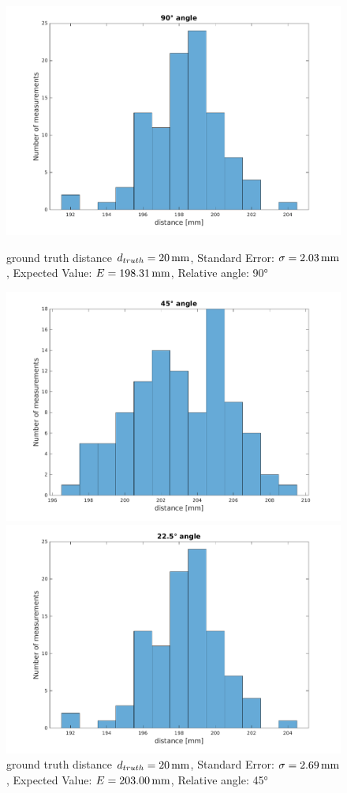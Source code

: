 \begin{figure}
	\centering
	\begin{minipage}{0.3\textwidth}
		\includegraphics[width=0.9\linewidth]{pictures/plot_angles_90.pdf}
		\caption{ground truth distance $d_{truth}= \unit[20]{mm}$, Standard Error: $\sigma=\unit[2.03]{mm}$, Expected Value: $E=\unit[198.31]{mm}$, Relative angle: 90°}
		\label{fig:angle90}
	\end{minipage}
	\quad
	\begin{minipage}{0.3\textwidth}
		\includegraphics[width=0.9\linewidth]{pictures/plot_angles_45.pdf}
		\caption{ground truth distance $d_{truth}= \unit[20]{mm}$, Standard Error: $\sigma=\unit[2.69]{mm}$, Expected Value: $E=\unit[203.00]{mm}$, Relative angle: 45°}
		\label{fig:angle45}
	\end{minipage}
	\quad
	\begin{minipage}{0.3\textwidth}
		\includegraphics[width=0.9\linewidth]{pictures/plot_angles_22.pdf}

\end{minipage}
\end{figure}
